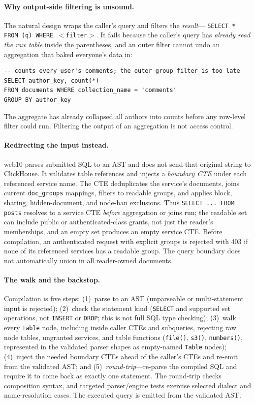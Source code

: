 \documentclass[sigconf, nonacm]{acmart}
\begin{document}
\paragraph{Why output-side filtering is unsound.} The natural design wraps the
caller's query and filters the \emph{result}---
\texttt{SELECT * FROM (q) WHERE $<$filter$>$}. It fails because the caller's
query has \emph{already read the raw table} inside the parentheses, and an
outer filter cannot undo an aggregation that baked everyone's data in:
\begin{lstlisting}[style=sql]
-- counts every user's comments; the outer group filter is too late
SELECT author_key, count(*)
FROM documents WHERE collection_name = 'comments'
GROUP BY author_key
\end{lstlisting}
The aggregate has already collapsed all authors into counts before any
row-level filter could run. Filtering the output of an aggregation is not
access control.

\paragraph{Redirecting the input instead.} web10 parses submitted SQL to an
AST and does not send that original string to ClickHouse. It validates table
references and injects a \emph{boundary CTE} under each referenced service
name. The CTE deduplicates the service's documents, joins current
\texttt{doc\_groups} mappings, filters to readable groups, and applies
block, sharing, hidden-document, and node-ban exclusions. Thus
\texttt{SELECT ... FROM posts} resolves to a service CTE \emph{before}
aggregation or joins run; the readable set can include public or
authenticated-class grants, not just the reader's memberships, and an empty
set produces an empty service CTE. Before compilation, an authenticated
request with explicit groups is rejected with 403 if none of its referenced
services has a readable group. The query boundary does not automatically
union in all reader-owned documents.

\paragraph{The walk and the backstop.} Compilation is five steps:
(1)~parse to an AST (unparseable or multi-statement input is rejected);
(2)~check the statement kind (\texttt{SELECT} and supported set operations,
not \texttt{INSERT} or \texttt{DROP}; this is not full SQL type checking);
(3)~walk every \texttt{Table} node, including inside caller CTEs and
subqueries, rejecting raw node tables, ungranted services, and table
functions (\texttt{file()}, \texttt{s3()}, \texttt{numbers()}, represented
in the validated parser shapes as empty-named \texttt{Table} nodes);
(4)~inject the needed boundary CTEs ahead of the caller's CTEs and re-emit
from the validated AST; and (5)~\emph{round-trip}---re-parse the compiled
SQL and require it to come back as exactly one statement. The round-trip
checks composition syntax, and targeted parser/engine tests exercise
selected dialect and name-resolution cases. The executed query is emitted
from the validated AST.
\end{document}
